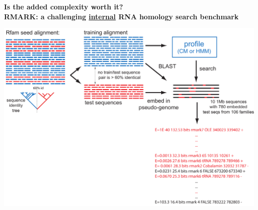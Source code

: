 \documentclass[landscape]{slides}
\begin{document}

\begin{slide}
\begin{center}
\textbf{Is the added complexity worth it? \\
  RMARK: a challenging \underline{internal} RNA homology search
  benchmark}

\includegraphics[width=10in]{figs/rmark-tree-2}
\end{center}

\vfill
\end{slide}
\end{document}
